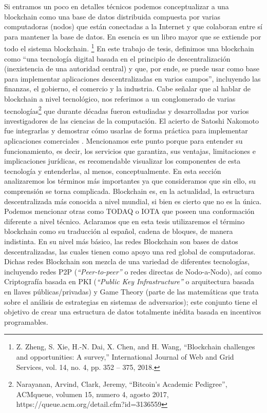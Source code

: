 \documentclass[12pt]{report} %
\begin{document}
Si entramos un poco en detalles técnicos podemos conceptualizar a una blockchain como una base de datos distribuida compuesta por varias computadoras (nodos) que están conectadas a la Internet y que colaboran entre sí para mantener la base de datos. En esencia es un libro mayor que se extiende por todo el sistema blockchain. \footnote{Z. Zheng, S. Xie, H.-N. Dai, X. Chen, and H. Wang, “Blockchain challenges and opportunities: A survey,” International Journal of Web and Grid Services, vol. 14, no. 4, pp. 352 – 375, 2018.}
En este trabajo de tesis, definimos una blockchain como “una tecnología digital basada en el principio de descentralización (inexistencia de una autoridad central) y que, por ende, se puede usar como base para implementar aplicaciones descentralizadas en varios campos”, incluyendo las finanzas, el gobierno, el comercio y la industria.
Cabe señalar que al hablar de blockchain a nivel tecnológico, nos referimos a un conglomerado de varias tecnologías\footnote{Narayanan, Arvind, Clark, Jeremy, “Bitcoin's Academic Pedigree”, ACMqueue, volumen 15,  numero 4, agosto 2017, https://queue.acm.org/detail.cfm?id=3136559 }  que durante décadas fueron estudiadas y desarrolladas por varios investigadores de las ciencias de la computación. El acierto de Satoshi Nakomoto fue integrarlas y demostrar cómo usarlas de forma práctica para implementar aplicaciones comerciales . Mencionamos este punto porque para entender su funcionamiento, es decir, los servicios que garantiza, sus ventajas, limitaciones e implicaciones jurídicas, es recomendable visualizar los componentes de esta tecnología y entenderlas, al menos, conceptualmente. En esta sección analizaremos los términos más importantes ya que consideramos que sin ello, su comprensión se torna complicada.
Blockchain es, en la actualidad, la estructura descentralizada más conocida a nivel mundial, si bien es cierto que no es la única. Podemos mencionar otras como TODAQ o IOTA que poseen una conformación diferente a nivel técnico.
Aclaramos que en esta tesis utilizaremos el término blockchain como su traducción al español, cadena de bloques, de manera indistinta. 
En su nivel más básico, las redes Blockchain son bases de datos descentralizadas, las cuales tienen como apoyo una red global de computadoras. Dichas redes Blockchain son mezcla de una variedad de diferentes tecnologías, incluyendo redes P2P (\textit{“Peer-to-peer”} o redes directas de Nodo-a-Nodo), así como Criptografía basada en PKI (\textit{“Public Key Infrastructure”} o arquitectura basada en llaves públicas/privadas) y Game Theory (parte de las matemáticas que trata sobre el análisis de estrategias en sistemas de adversarios); este conjunto tiene el objetivo de crear una estructura de datos totalmente inédita basada en incentivos programables. 
\end{document}
